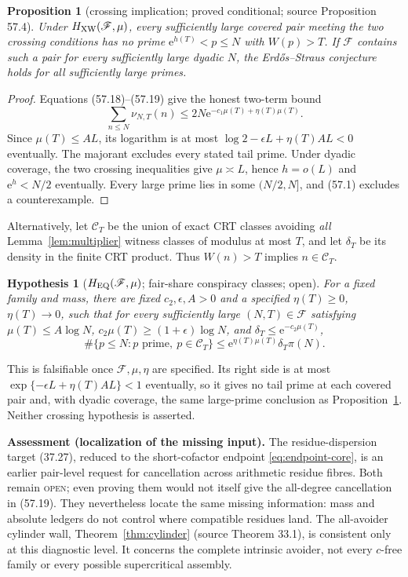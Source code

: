 \documentclass[10pt,reqno]{amsart}
\newtheorem{proposition}[theorem]{Proposition}
\newtheorem{hypothesis}[theorem]{Hypothesis}
\theoremstyle{definition}
\newcommand{\e}{\mathrm e}
\newcommand{\1}{\mathbf 1}
\begin{document}
\begin{proposition}[crossing implication; proved conditional; source
Proposition 57.4]\label{prop:crossing}
Under $H_{\rm XW}(\mathscr F,\mu)$, every sufficiently large covered pair
meeting the two crossing conditions has no prime
$\e^{h(T)}<p\leq N$ with $W(p)>T$.  If $\mathscr F$ contains such a pair
for every sufficiently large dyadic $N$, the Erd\H{o}s--Straus conjecture
holds for all sufficiently large primes.
\end{proposition}
\begin{proof}
Equations (57.18)--(57.19) give the honest two-term bound
\[
 \sum_{n\leq N}\nu_{N,T}(n)
 \leq2N\e^{-c_1\mu(T)+\eta(T)\mu(T)}.
\]
Since $\mu(T)\leq AL$, its logarithm is at most
$\log2-\epsilon L+\eta(T)AL<0$ eventually.  The majorant excludes every
stated tail prime.  Under dyadic coverage, the two crossing inequalities
give $\mu\asymp L$, hence $h=o(L)$ and $\e^h<N/2$ eventually.  Every large
prime lies in some $(N/2,N]$, and (57.1) excludes a counterexample.
\end{proof}

Alternatively, let $\mathcal C_T$ be the union of exact CRT classes avoiding
\emph{all} Lemma~\ref{lem:multiplier} witness classes of modulus at most
$T$, and let $\delta_T$ be its density in the finite CRT product.  Thus
$W(n)>T$ implies $n\in\mathcal C_T$.

\begin{hypothesis}[$H_{\rm EQ}(\mathscr F,\mu)$; fair-share conspiracy
classes; open]\label{hyp:EQ}
For a fixed family and mass, there are fixed $c_2,\epsilon,A>0$ and a
specified $\eta(T)\geq0$, $\eta(T)\to0$, such that for every sufficiently
large $(N,T)\in\mathscr F$ satisfying $\mu(T)\leq A\log N$,
$c_2\mu(T)\geq(1+\epsilon)\log N$, and
$\delta_T\leq\e^{-c_2\mu(T)}$,
\begin{equation}\tag{57.20}
 \#\{p\leq N:p\text{ prime},\ p\in\mathcal C_T\}
 \leq\e^{\eta(T)\mu(T)}\delta_T\pi(N).
\end{equation}
\end{hypothesis}
This is falsifiable once $\mathscr F,\mu,\eta$ are specified.  Its right
side is at most $\exp\{-\epsilon L+\eta(T)AL\}<1$ eventually, so it gives no
tail prime at each covered pair and, with dyadic coverage, the same
large-prime conclusion as Proposition~\ref{prop:crossing}.  Neither crossing
hypothesis is asserted.

\medskip\noindent\textbf{Assessment (localization of the missing input).}
The residue-dispersion target (37.27), reduced to the short-cofactor endpoint
\eqref{eq:endpoint-core}, is an earlier pair-level request for cancellation
across arithmetic residue fibres.  Both remain \textsc{open}; even proving
them would not itself give the all-degree cancellation in (57.19).  They
nevertheless locate the same missing information: mass and absolute ledgers
do not control where compatible residues land.  The
all-avoider cylinder wall, Theorem~\ref{thm:cylinder} (source Theorem 33.1),
is consistent only at this diagnostic level.  It concerns the complete
intrinsic avoider, not every $c$-free family or every possible supercritical
assembly.
\end{document}
